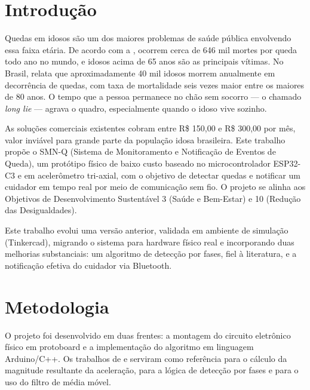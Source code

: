 
\section{\esp Introdução}

Quedas em idosos são um dos maiores problemas de saúde pública envolvendo essa faixa etária. De acordo com a , ocorrem cerca de 646 mil mortes por queda todo ano no mundo, e idosos acima de 65 anos são as principais vítimas. No Brasil,  relata que aproximadamente 40 mil idosos morrem anualmente em decorrência de quedas, com taxa de mortalidade seis vezes maior entre os maiores de 80 anos. O tempo que a pessoa permanece no chão sem socorro --- o chamado \textit{long lie} --- agrava o quadro, especialmente quando o idoso vive sozinho.

As soluções comerciais existentes cobram entre R\$ 150,00 e R\$ 300,00 por mês, valor inviável para grande parte da população idosa brasileira. Este trabalho propõe o SMN-Q (Sistema de Monitoramento e Notificação de Eventos de Queda), um protótipo físico de baixo custo baseado no microcontrolador ESP32-C3 e em acelerômetro tri-axial, com o objetivo de detectar quedas e notificar um cuidador em tempo real por meio de comunicação sem fio. O projeto se alinha aos Objetivos de Desenvolvimento Sustentável 3 (Saúde e Bem-Estar) e 10 (Redução das Desigualdades).

Este trabalho evolui uma versão anterior, validada em ambiente de simulação (Tinkercad), migrando o sistema para hardware físico real e incorporando duas melhorias substanciais: um algoritmo de detecção por fases, fiel à literatura, e a notificação efetiva do cuidador via Bluetooth.

\section{\esp Metodologia}

O projeto foi desenvolvido em duas frentes: a montagem do circuito eletrônico físico em protoboard e a implementação do algoritmo em linguagem Arduino/C++. Os trabalhos de  e  serviram como referência para o cálculo da magnitude resultante da aceleração, para a lógica de detecção por fases e para o uso do filtro de média móvel.

